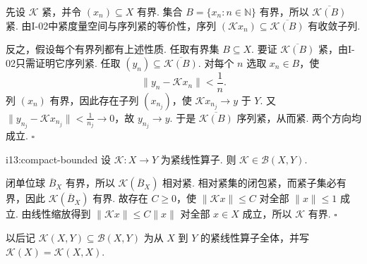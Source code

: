 \begin{FAProof}
先设 \(\displaystyle \mathcal K\) 紧，并令 \(\displaystyle (x_n)\subseteq X\) 有界. 集合 \(\displaystyle B=\{x_n:n\in\mathbb N\}\) 有界，所以 \(\displaystyle \overline{\mathcal K(B)}\) 紧. 由I-02中紧度量空间与序列紧的等价性，序列 \(\displaystyle (\mathcal Kx_n)\subseteq\overline{\mathcal K(B)}\) 有收敛子列.

反之，假设每个有界列都有上述性质. 任取有界集 \(\displaystyle B\subseteq X\). 要证 \(\displaystyle \overline{\mathcal K(B)}\) 紧，由I-02只需证明它序列紧. 任取 \(\displaystyle (y_n)\subseteq\overline{\mathcal K(B)}\). 对每个 \(\displaystyle n\) 选取 \(\displaystyle x_n\in B\)，使
\[
\|y_n-\mathcal Kx_n\|<\frac{1}{n}.
\]
列 \(\displaystyle (x_n)\) 有界，因此存在子列 \(\displaystyle (x_{n_j})\)，使 \(\displaystyle \mathcal Kx_{n_j}\to y\) 于 \(\displaystyle Y\). 又 \(\displaystyle \|y_{n_j}-\mathcal Kx_{n_j}\|<\frac{1}{n_j}\to0\)，故 \(\displaystyle y_{n_j}\to y\). 于是 \(\displaystyle \overline{\mathcal K(B)}\) 序列紧，从而紧. 两个方向均成立.
\hfill\(\square\)
\end{FAProof}

\begin{FAProposition}[B][紧线性算子自动有界]{i13:compact-bounded}
设 \(\displaystyle \mathcal K:X\to Y\) 为紧线性算子. 则 \(\displaystyle \mathcal K\in\mathcal B(X,Y)\).
\end{FAProposition}

\begin{FAProof}
闭单位球 \(\displaystyle \overline B_X\) 有界，所以 \(\displaystyle \mathcal K(\overline B_X)\) 相对紧. 相对紧集的闭包紧，而紧子集必有界，因此 \(\displaystyle \mathcal K(\overline B_X)\) 有界. 故存在 \(\displaystyle C\geqslant0\)，使 \(\displaystyle \|\mathcal Kx\|\leqslant C\) 对全部 \(\displaystyle \|x\|\leqslant1\) 成立. 由线性缩放得到 \(\displaystyle \|\mathcal Kx\|\leqslant C\|x\|\) 对全部 \(\displaystyle x\in X\) 成立，所以 \(\displaystyle \mathcal K\) 有界.
\hfill\(\square\)
\end{FAProof}

以后记 \(\displaystyle \mathcal K(X,Y)\subseteq\mathcal B(X,Y)\) 为从 \(\displaystyle X\) 到 \(\displaystyle Y\) 的紧线性算子全体，并写 \(\displaystyle \mathcal K(X)=\mathcal K(X,X)\).

